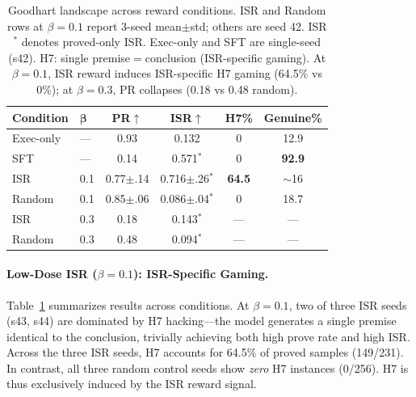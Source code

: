 \begin{table}[t]
\centering
\small
\begin{tabular}{llcccc}
\toprule
\textbf{Condition} & $\boldsymbol{\beta}$ & \textbf{PR}$\uparrow$ & \textbf{ISR}$\uparrow$ & \textbf{H7\%} & \textbf{Genuine\%} \\
\midrule
Exec-only & --- & 0.93 & 0.132 & 0 & 12.9 \\
SFT & --- & 0.14 & 0.571$^*$ & 0 & \textbf{92.9} \\
\midrule
ISR & 0.1 & 0.77{\scriptsize$\pm$.14} & 0.716{\scriptsize$\pm$.26}$^*$ & \textbf{64.5} & $\sim$16 \\
Random & 0.1 & 0.85{\scriptsize$\pm$.06} & 0.086{\scriptsize$\pm$.04}$^*$ & 0 & 18.7 \\
\midrule
ISR & 0.3 & 0.18 & 0.143$^*$ & --- & --- \\
Random & 0.3 & 0.48 & 0.094$^*$ & --- & --- \\
\bottomrule
\end{tabular}
\caption{Goodhart landscape across reward conditions. ISR and Random rows at $\beta{=}0.1$ report 3-seed mean$\pm$std; others are seed 42. ISR$^*$ denotes proved-only ISR. Exec-only and SFT are single-seed (s42). H7: single premise$=$conclusion (ISR-specific gaming). At $\beta{=}0.1$, ISR reward induces ISR-specific H7 gaming (64.5\% vs 0\%); at $\beta{=}0.3$, PR collapses (0.18 vs 0.48 random).}
\label{tab:goodhart-landscape}
\end{table}

\paragraph{Low-Dose ISR ($\beta{=}0.1$): ISR-Specific Gaming.}
Table~\ref{tab:goodhart-landscape} summarizes results across conditions. At $\beta{=}0.1$, two of three ISR seeds (s43, s44) are dominated by H7 hacking---the model generates a single premise identical to the conclusion, trivially achieving both high prove rate and high ISR. Across the three ISR seeds, H7 accounts for 64.5\% of proved samples (149/231). In contrast, all three random control seeds show \emph{zero} H7 instances (0/256). H7 is thus exclusively induced by the ISR reward signal.

